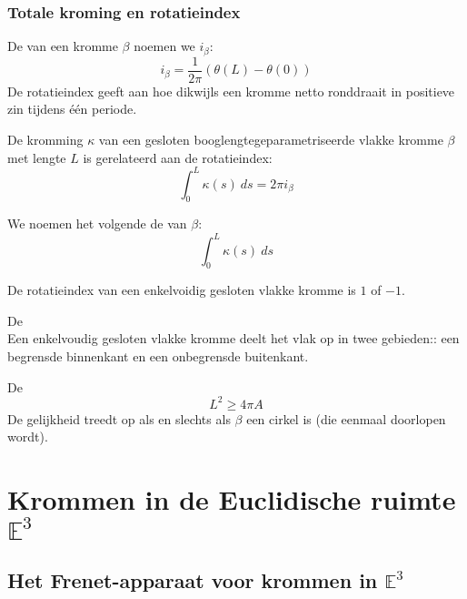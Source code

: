 \documentclass[main.tex]{subfiles}
\begin{document}
\subsection{Totale kroming en rotatieindex}
\label{sec:totale-kroming-en}

\begin{de}
  De  van een kromme $\beta$ noemen we $i_{\beta}$:
  \[ i_{\beta} = \frac{1}{2\pi} (\theta(L) - \theta(0)) \]
  De rotatieindex geeft aan hoe dikwijls een kromme netto ronddraait in positieve zin tijdens \'e\'en periode.
\end{de}

\begin{st}
  De kromming $\kappa$ van een gesloten booglengtegeparametriseerde vlakke kromme $\beta$ met lengte $L$ is gerelateerd aan de rotatieindex:
  \[ \int_{0}^{L}\kappa(s)\ ds = 2\pi i_{\beta} \]
\end{st}

\begin{de}
  We noemen het volgende de  van $\beta$:
  \[ \int_{0}^{L}\kappa(s)\ ds \]
\end{de}

\begin{st}
  De rotatieindex van een enkelvoidig gesloten vlakke kromme is $1$ of $-1$.
\zb
\end{st}

\begin{st}
  De \\
  Een enkelvoudig gesloten vlakke kromme deelt het vlak op in twee gebieden:: een begrensde binnenkant en een onbegrensde buitenkant.
\zb
\end{st}

\begin{st}
  De \\
  \[ L^{2} \ge 4\pi A \]
  De gelijkheid treedt op als en slechts als $\beta$ een cirkel is (die eenmaal doorlopen wordt).
\zb
\end{st}


\chapter{Krommen in de Euclidische ruimte$\mathbb{E}^{3}$}
\label{cha:kromm-het-eucl}

\section{Het Frenet-apparaat voor krommen in $\mathbb{E}^{3}$}
\label{sec:het-frenet-apparaat-voor-krommen-in-e3}
\end{document}
